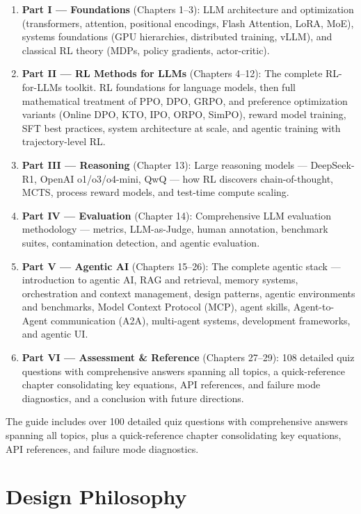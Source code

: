 \documentclass[11pt,a4paper,openany]{book}
\begin{document}
\begin{enumerate}
  \item \textbf{Part I --- Foundations} (Chapters 1--3): LLM architecture and optimization (transformers, attention, positional encodings, Flash Attention, LoRA, MoE), systems foundations (GPU hierarchies, distributed training, vLLM), and classical RL theory (MDPs, policy gradients, actor-critic).
  \item \textbf{Part II --- RL Methods for LLMs} (Chapters 4--12): The complete RL-for-LLMs toolkit. RL foundations for language models, then full mathematical treatment of PPO, DPO, GRPO, and preference optimization variants (Online DPO, KTO, IPO, ORPO, SimPO), reward model training, SFT best practices, system architecture at scale, and agentic training with trajectory-level RL.
  \item \textbf{Part III --- Reasoning} (Chapter 13): Large reasoning models --- DeepSeek-R1, OpenAI o1/o3/o4-mini, QwQ --- how RL discovers chain-of-thought, MCTS, process reward models, and test-time compute scaling.
  \item \textbf{Part IV --- Evaluation} (Chapter 14): Comprehensive LLM evaluation methodology --- metrics, LLM-as-Judge, human annotation, benchmark suites, contamination detection, and agentic evaluation.
  \item \textbf{Part V --- Agentic AI} (Chapters 15--26): The complete agentic stack --- introduction to agentic AI, RAG and retrieval, memory systems, orchestration and context management, design patterns, agentic environments and benchmarks, Model Context Protocol (MCP), agent skills, Agent-to-Agent communication (A2A), multi-agent systems, development frameworks, and agentic UI.
  \item \textbf{Part VI --- Assessment \& Reference} (Chapters 27--29): 108 detailed quiz questions with comprehensive answers spanning all topics, a quick-reference chapter consolidating key equations, API references, and failure mode diagnostics, and a conclusion with future directions.
\end{enumerate}

The guide includes over 100 detailed quiz questions with comprehensive answers spanning all topics, plus a quick-reference chapter consolidating key equations, API references, and failure mode diagnostics.

\section*{Design Philosophy}
\label{design-philosophy}
\end{document}

